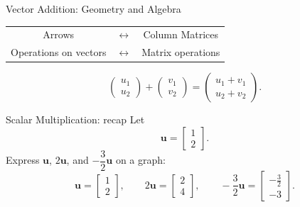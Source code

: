 \begin{frame}{Vector Addition: Geometry and Algebra}
  \begin{center}
    \begin{tabular}{ccc}
        
    Arrows &$\longleftrightarrow$ &Column Matrices\\

    Operations on vectors &$\longleftrightarrow$ &Matrix operations\\
    \end{tabular}
  \end{center}
  \[
    \begin{pmatrix}u_1\\u_2\end{pmatrix}
    +
    \begin{pmatrix}v_1\\v_2\end{pmatrix}
    =
    \begin{pmatrix}u_1+v_1\\u_2+v_2\end{pmatrix}.
  \]
\end{frame}

\begin{frame}{Scalar Multiplication: recap}
  Let
  \[
    \mathbf{u}=\begin{bmatrix}1\\2\end{bmatrix}.
  \]
  Express $\mathbf{u}$, $2\mathbf{u}$, and
  $-\dfrac{3}{2}\mathbf{u}$ on a graph:
  \[
    \mathbf{u}=\begin{bmatrix}1\\2\end{bmatrix},\qquad
    2\mathbf{u}=\begin{bmatrix}2\\4\end{bmatrix},\qquad
    -\frac32\mathbf{u}=\begin{bmatrix}-\frac32\\-3\end{bmatrix}.
  \]
\end{frame}

